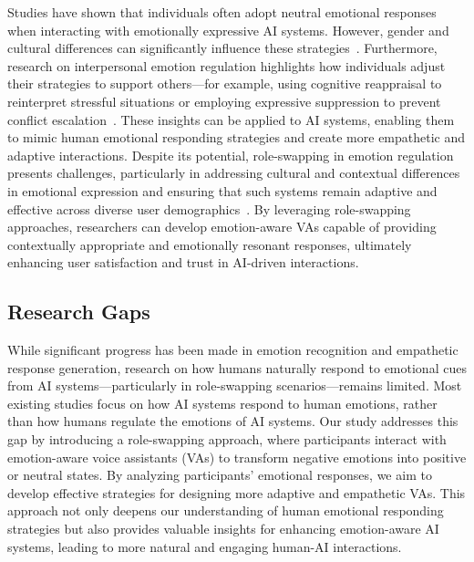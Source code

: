 Studies have shown that individuals often adopt neutral emotional responses when interacting with emotionally expressive AI systems. However, gender and cultural differences can significantly influence these strategies~\cite{ma2022should,huang2024relationship}. Furthermore, research on interpersonal emotion regulation highlights how individuals adjust their strategies to support others—for example, using cognitive reappraisal to reinterpret stressful situations or employing expressive suppression to prevent conflict escalation~\cite{zaki2013interpersonal,gross2015emotion}. These insights can be applied to AI systems, enabling them to mimic human emotional responding strategies and create more empathetic and adaptive interactions.
Despite its potential, role-swapping in emotion regulation presents challenges, particularly in addressing cultural and contextual differences in emotional expression and ensuring that such systems remain adaptive and effective across diverse user demographics~\cite{mesquita1992cultural,fischer2004gender}. By leveraging role-swapping approaches, researchers can develop emotion-aware VAs capable of providing contextually appropriate and emotionally resonant responses, ultimately enhancing user satisfaction and trust in AI-driven interactions.

\subsection{Research Gaps}
While significant progress has been made in emotion recognition and empathetic response generation, research on how humans naturally respond to emotional cues from AI systems—particularly in role-swapping scenarios—remains limited. Most existing studies focus on how AI systems respond to human emotions, rather than how humans regulate the emotions of AI systems.
Our study addresses this gap by introducing a role-swapping approach, where participants interact with emotion-aware voice assistants (VAs) to transform negative emotions into positive or neutral states. By analyzing participants’ emotional responses, we aim to develop effective strategies for designing more adaptive and empathetic VAs. This approach not only deepens our understanding of human emotional responding strategies but also provides valuable insights for enhancing emotion-aware AI systems, leading to more natural and engaging human-AI interactions.
